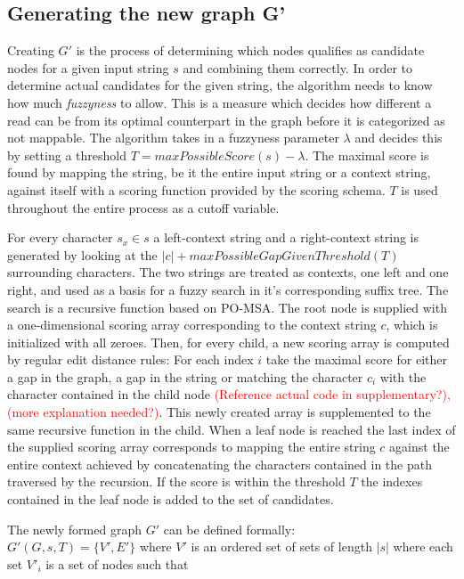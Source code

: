 \documentclass{article}
\begin{document}
\subsection{Generating the new graph G'}
Creating $G'$ is the process of determining which nodes qualifies as candidate nodes for a given input string $s$ and combining them correctly. In order to determine actual candidates for the given string, the algorithm needs to know how much \textit{fuzzyness} to allow. This is a measure which decides how different a read can be from its optimal counterpart in the graph before it is categorized as not mappable. The algorithm takes in a fuzzyness parameter $\lambda$ and decides this by setting a threshold $T=maxPossibleScore(s)-\lambda$. The maximal score is found by mapping the string, be it the entire input string or a context string, against itself with a scoring function provided by the scoring schema. $T$ is used throughout the entire process as a cutoff variable.\\
\par\noindent
For every character $s_x \in s$ a left-context string and a right-context string is generated by looking at the $|c| + maxPossibleGapGivenThreshold(T)$ surrounding characters. The two strings are treated as contexts, one left and one right, and used as a basis for a fuzzy search in it's corresponding suffix tree. The search is a recursive function based on PO-MSA. The root node is supplied with a one-dimensional scoring array corresponding to the context string $c$, which is initialized with all zeroes. Then, for every child, a new scoring array is computed by regular edit distance rules: For each index $i$ take the maximal score for either a gap in the graph, a gap in the string or matching the character $c_i$ with the character contained in the child node \textcolor{red}{(Reference actual code in supplementary?), (more explanation needed?)}. This newly created array is supplemented to the same recursive function in the child. When a leaf node is reached the last index of the supplied scoring array corresponds to mapping the entire string $c$ against the entire context achieved by concatenating the characters contained in the path traversed by the recursion. If the score is within the threshold $T$ the indexes contained in the leaf node is added to the set of candidates.\\
\par\noindent
The newly formed graph $G'$ can be defined formally:\\
$G'(G, s, T) = \{V', E'\}$ 
where $V'$ is an ordered set of sets of length $|s|$ where each set $V'_i$ is a set of nodes such that\\
\end{document}
